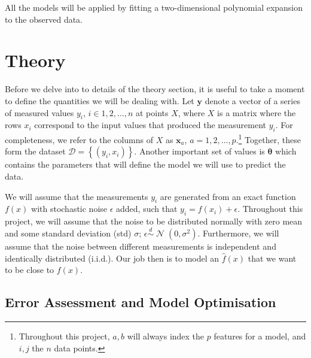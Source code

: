 \documentclass[twocolumn,english,notitlepage]{article}
\renewcommand{\vec}[1]{\boldsymbol{#1}}
\newcommand{\pclosed}[1]{\left(#1\right)}
\newcommand{\cclosed}[1]{\left\{#1\right\}}
\newcommand{\normal}[2]{\operatorname{\mathcal{N}}\pclosed{#1,#2}}
\newcommand{\distas}{\overset{d}{\sim}}
\begin{document}
    All the models will be applied by fitting a two-dimensional polynomial expansion to the observed data.




\section{Theory}
    Before we delve into to details of the theory section, it is useful to take a moment to define the quantities we will be dealing with. Let $\vec{y}$ denote a vector of a series of measured values $y_i$, $i\in 1, 2,\ldots, n$ at points $X$, where $X$ is a matrix where the rows $x_i$ correspond to the input values that produced the measurement $y_i$. For completeness, we refer to the columns of $X$ as $\vec{x}_a$, $a=1, 2,\ldots, p$.\footnote{Throughout this project, $a, b$ will always index the $p$ features for a model, and $i, j$ the $n$ data points.} Together, these form the dataset $\mathcal{D} = \cclosed{(y_i, x_i)}$. Another important set of values is $\vec{\theta}$ which contains the parameters that will define the model we will use to predict the data.

    We will assume that the measurements $y_i$ are generated from an exact function $f(x)$ with stochastic noise $\epsilon$ added, such that $y_i = f(x_i) + \epsilon$. Throughout this project, we will assume that the noise to be distributed normally with zero mean and some standard deviation (std) $\sigma$; $\epsilon \distas \normal{0}{\sigma^2}$. Furthermore, we will assume that the noise between different measurements is independent and identically distributed (i.i.d.). Our job then is to model an $\hat{f}(x)$ that we want to be close to $f(x)$.

    \subsection{Error Assessment and Model Optimisation}
\end{document}
